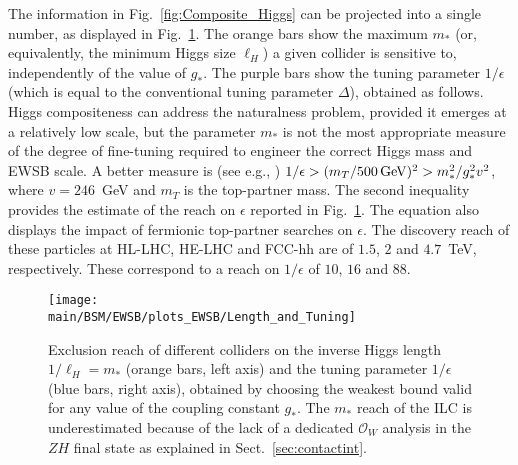 \documentclass[../report.tex]{subfiles}
\providecommand{\main}{..}
\begin{document}
The information in Fig.~\ref{fig:Composite_Higgs} can be projected into a single number, as displayed in Fig.~\ref{fig:Composite_Higgs_Summary}. The orange bars show the maximum $m_*$ (or, equivalently, the minimum Higgs size $\ell_H$) a given collider is sensitive to, independently of the value of $g_*$. The purple bars show the tuning parameter $1/\epsilon$ (which is equal to the conventional tuning parameter $\Delta$), obtained as follows. Higgs compositeness can address the naturalness problem, provided it emerges at a relatively low scale, but the parameter $m_*$ is not the most appropriate measure of the degree of fine-tuning required to engineer the correct Higgs mass and EWSB scale. A better measure is (see e.g., \cite{Matsedonskyi:2015dns}) $1/\epsilon>(m_T/500\,{\rm{GeV}})^2>m_*^2/g_*^2v^2$,
where $v=246$~GeV and $m_T$ is the top-partner mass. The second inequality provides the estimate of the reach on $\epsilon$ reported in Fig.~\ref{fig:Composite_Higgs_Summary}. The equation also displays the impact of fermionic top-partner searches on $\epsilon$. The discovery reach of these particles at HL-LHC, HE-LHC and FCC-hh are of $1.5$, $2$ and $4.7$~TeV, respectively. These correspond to a reach on $1/\epsilon$ of $10$, $16$ and $88$.

\begin{figure}[t]
    \centering
    \texttt{[image: \\main/BSM/EWSB/plots\_EWSB/Length\_and\_Tuning]}
    \caption{Exclusion reach of different colliders on the inverse Higgs length $1/\ell_H =m_*$ (orange bars, left axis) and the tuning parameter $1/\epsilon$ (blue bars, right axis), obtained by choosing the weakest bound valid for any value of the coupling constant $g_*$. The $m_*$ reach of the ILC is underestimated because of the lack of a dedicated $\mathcal{O}_{W}$ analysis in the $ZH$ final state as explained in Sect.~\ref{sec:contactint}.}
    \label{fig:Composite_Higgs_Summary}
\end{figure}
\end{document}
